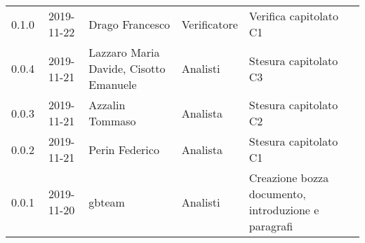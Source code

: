 {\begin{longtable}{ c c  C{4cm}  C{3cm} C{4cm}}
0.1.0 & 2019-11-22 & Drago Francesco & Verificatore & Verifica capitolato C1 \\

0.0.4 & 2019-11-21 & Lazzaro Maria Davide, Cisotto Emanuele & Analisti & Stesura capitolato C3 \\

0.0.3 & 2019-11-21 & Azzalin Tommaso & Analista & Stesura capitolato C2  \\

0.0.2 & 2019-11-21 & Perin Federico & Analista & Stesura capitolato C1  \\
		
0.0.1 & 2019-11-20 & gbteam & Analisti & Creazione bozza documento, introduzione e paragrafi \\
		
\end{longtable}
}
